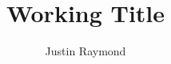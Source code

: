 \documentclass[11pt, ma]{westhesis}
\title{Working Title}
\author{Justin Raymond}
\begin{document}
\frontmatter
\maketitle
\makededication
\makeack
\makeabstract        %
\tableofcontents

\mainmatter











\end{document}
